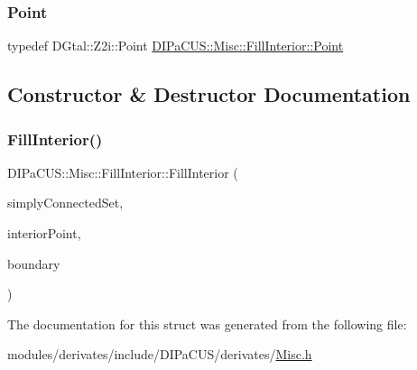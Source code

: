 \subsubsection{\texorpdfstring{Point}{Point}}
{\footnotesize\ttfamily typedef D\+Gtal\+::\+Z2i\+::\+Point \hyperlink{structDIPaCUS_1_1Misc_1_1FillInterior_a88bed595883eb022eb4e9f093ee00d18}{D\+I\+Pa\+C\+U\+S\+::\+Misc\+::\+Fill\+Interior\+::\+Point}}



\subsection{Constructor \& Destructor Documentation}
\mbox{\label{structDIPaCUS_1_1Misc_1_1FillInterior_a05ba475a43a025a4d06577b3ad20e298}} 
\subsubsection{\texorpdfstring{Fill\+Interior()}{FillInterior()}}
{\footnotesize\ttfamily D\+I\+Pa\+C\+U\+S\+::\+Misc\+::\+Fill\+Interior\+::\+Fill\+Interior (\begin{DoxyParamCaption}\item[{\hyperlink{structDIPaCUS_1_1Misc_1_1FillInterior_a6fb325418d6c5f5e07619176576708aa}{Digital\+Set} \&}]{simply\+Connected\+Set,  }\item[{const \hyperlink{structDIPaCUS_1_1Misc_1_1FillInterior_a88bed595883eb022eb4e9f093ee00d18}{Point} \&}]{interior\+Point,  }\item[{const \hyperlink{structDIPaCUS_1_1Misc_1_1FillInterior_a6fb325418d6c5f5e07619176576708aa}{Digital\+Set} \&}]{boundary }\end{DoxyParamCaption})}



The documentation for this struct was generated from the following file\+:\begin{DoxyCompactItemize}
\item 
modules/derivates/include/\+D\+I\+Pa\+C\+U\+S/derivates/\hyperlink{Misc_8h}{Misc.\+h}\end{DoxyCompactItemize}
